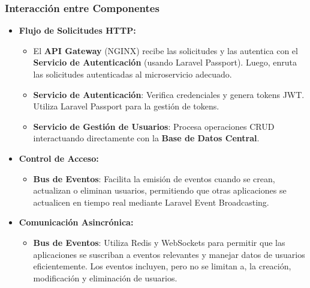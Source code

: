 \documentclass{article}
\begin{document}
\subsubsection{Interacción entre Componentes}
\begin{itemize}
    \item \textbf{Flujo de Solicitudes HTTP:}
          \begin{itemize}
              \item El \textbf{API Gateway} (NGINX) recibe las solicitudes y las autentica con el \textbf{Servicio de Autenticación} (usando Laravel Passport). Luego, enruta las solicitudes autenticadas al microservicio adecuado.
              \item \textbf{Servicio de Autenticación}: Verifica credenciales y genera tokens JWT. Utiliza Laravel Passport para la gestión de tokens.
              \item \textbf{Servicio de Gestión de Usuarios}: Procesa operaciones CRUD interactuando directamente con la \textbf{Base de Datos Central}.
          \end{itemize}
    \item \textbf{Control de Acceso:}
          \begin{itemize}
              \item \textbf{Bus de Eventos}: Facilita la emisión de eventos cuando se crean, actualizan o eliminan usuarios, permitiendo que otras aplicaciones se actualicen en tiempo real mediante Laravel Event Broadcasting.
          \end{itemize}
    \item \textbf{Comunicación Asincrónica:}
          \begin{itemize}
              \item \textbf{Bus de Eventos}: Utiliza Redis y WebSockets para permitir que las aplicaciones se suscriban a eventos relevantes y manejar datos de usuarios eficientemente. Los eventos incluyen, pero no se limitan a, la creación, modificación y eliminación de usuarios.
          \end{itemize}
\end{itemize}
\end{document}
